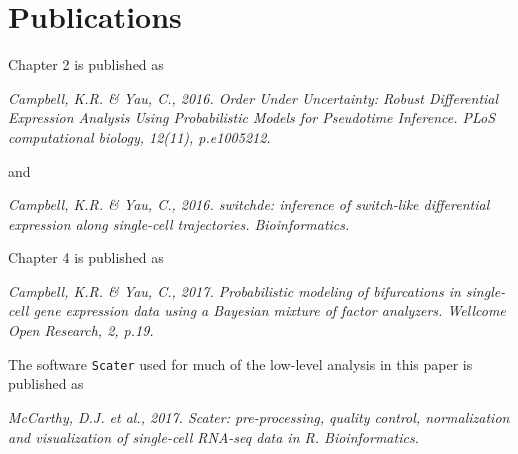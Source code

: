 \chapter*{Publications}



Chapter 2 is published as 
\begin{displayquote}
\emph{Campbell, K.R. \& Yau, C., 2016. Order Under Uncertainty: Robust Differential Expression Analysis Using Probabilistic Models for Pseudotime Inference. PLoS computational biology, 12(11), p.e1005212.}
\end{displayquote}
and
\begin{displayquote}
\emph{Campbell, K.R. \& Yau, C., 2016. switchde: inference of switch-like differential expression along single-cell trajectories. Bioinformatics.
}
\end{displayquote}
Chapter 4 is published as
\begin{displayquote}
\emph{Campbell, K.R. \& Yau, C., 2017. Probabilistic modeling of bifurcations in single-cell gene expression data using a Bayesian mixture of factor analyzers. Wellcome Open Research, 2, p.19. 
}
\end{displayquote}
The software \texttt{Scater} used for much of the low-level analysis in this paper is published as
\begin{displayquote}
\emph{McCarthy, D.J. et al., 2017. Scater: pre-processing, quality control, normalization and visualization of single-cell RNA-seq data in R. Bioinformatics.}
\end{displayquote}


